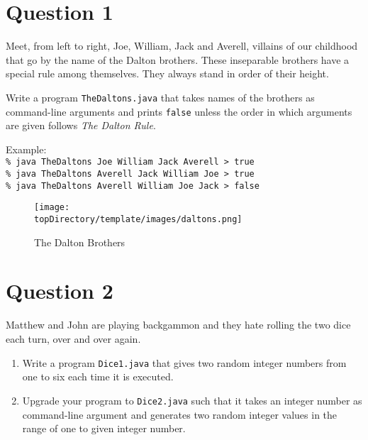 \section*{Question 1}
Meet, from left to right, Joe, William, Jack and Averell, villains of our childhood that go by the name of the Dalton brothers. These inseparable brothers have a special rule among themselves. They always stand in order of their height.

Write a program \texttt{TheDaltons.java} that takes names of the brothers as command-line arguments and prints \texttt{false} unless the order in which arguments are given follows \textit{The Dalton Rule}.

Example:\\
\texttt{\% java TheDaltons Joe William Jack Averell > true}\\
\texttt{\% java TheDaltons Averell Jack William Joe > true}\\
\texttt{\% java TheDaltons Averell William Joe Jack > false}

\begin{figure}[H]\centering
\texttt{[image: \\topDirectory/template/images/daltons.png]}
\caption{The Dalton Brothers}
\end{figure}

\section*{Question 2}

Matthew and John are playing backgammon and they hate rolling the two dice each turn, over and over again.

\begin{enumerate}
\item Write a program \texttt{Dice1.java} that gives two random integer numbers from one to six each time it is executed.
\item Upgrade your program to \texttt{Dice2.java} such that it takes an integer number as command-line argument and generates two random integer values in the range of one to given integer number.
\end{enumerate}
